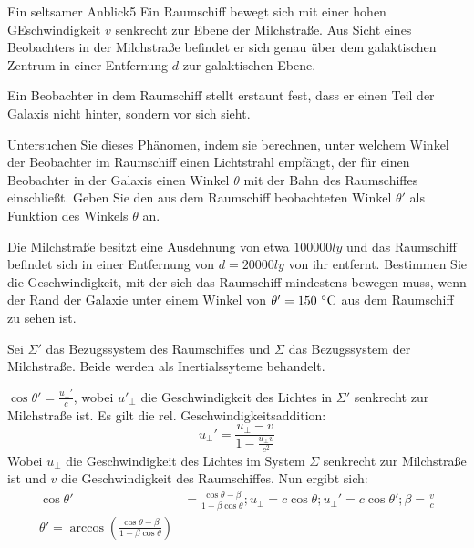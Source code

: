 \begin{problem}{Ein seltsamer Anblick}{5}
Ein Raumschiff bewegt sich mit einer hohen GEschwindigkeit $v$ senkrecht zur Ebene der Milchstraße.  Aus Sicht eines Beobachters in der Milchstraße befindet er sich genau über dem galaktischen Zentrum in einer Entfernung $d$ zur galaktischen Ebene.

Ein Beobachter in dem Raumschiff stellt erstaunt fest, dass er einen Teil der Galaxis nicht hinter, sondern vor sich sieht.
\begin{abcenum}
 \item Untersuchen Sie dieses Phänomen, indem sie berechnen, unter welchem Winkel der Beobachter im Raumschiff einen Lichtstrahl empfängt, der für einen Beobachter in der Galaxis einen Winkel $\theta$ mit der Bahn des Raumschiffes einschließt.  Geben Sie den aus dem Raumschiff beobachteten Winkel $\theta'$ als Funktion des Winkels $\theta$ an.
 \item Die Milchstraße besitzt eine Ausdehnung von etwa $100000\unit{ly}$ und das Raumschiff befindet sich in einer Entfernung von $d=20000\unit{ly}$ von ihr entfernt.  Bestimmen Sie die Geschwindigkeit, mit der sich das Raumschiff mindestens bewegen muss, wenn der Rand der Galaxie unter einem Winkel von $\theta'=150\,\mathrm{\,^\circ\mathrm{C}}$ aus dem Raumschiff zu sehen ist.
\end{abcenum}
\begin{solution}
 Sei $\Sigma'$ das Bezugssystem des Raumschiffes und $\Sigma$ das Bezugssystem der Milchstraße.  Beide werden als Inertialssyteme behandelt.
  \begin{abcenum}
    \item $\cos \theta'=\frac{u_\perp'}{c}$, wobei $u'_\perp$ die Geschwindigkeit des Lichtes in $\Sigma'$ senkrecht zur Milchstraße ist.  Es gilt die rel. Geschwindigkeitsaddition:
      \begin{equation*}
        u_\perp'=\frac{u_\perp-v}{1-\frac{u_\perp v}{c^2}}
      \end{equation*}
  Wobei $u_\perp$ die Geschwindigkeit des Lichtes im System $\Sigma$ senkrecht zur Milchstraße ist und $v$ die Geschwindigkeit des Raumschiffes.  Nun ergibt sich:
  \begin{align*}
    \cos\theta'&=\frac{\cos\theta-\beta}{1-\beta\cos\theta}; u_\perp=c\cos\theta; u_\perp'=c\cos\theta'; \beta=\frac vc\\
\theta'=\arccos\left(\frac{\cos\theta -\beta}{1-\beta\cos\theta}\right)
  \end{align*}
    \item

\end{abcenum}
\end{solution}
\end{problem}
